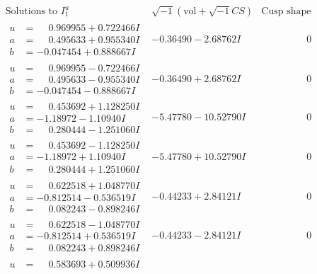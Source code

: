 \documentclass[1p]{elsarticle_modified}
\theoremstyle{definition}
\newcommand{\I}{\sqrt{-1}}
\begin{document}
$$\begin{array}{c|c|c}
\text{Solutions to }I^u_{1}& \I (\text{vol} + \sqrt{-1}CS) & \text{Cusp shape}\\
 \hline 
\begin{aligned}
u &= \phantom{-}0.969955 + 0.722466 I \\
a &= \phantom{-}0.495633 + 0.955340 I \\
b &= -0.047454 + 0.888667 I\end{aligned}
 & -0.36490 - 2.68762 I & \phantom{-0.000000 } 0 \\ \hline\begin{aligned}
u &= \phantom{-}0.969955 - 0.722466 I \\
a &= \phantom{-}0.495633 - 0.955340 I \\
b &= -0.047454 - 0.888667 I\end{aligned}
 & -0.36490 + 2.68762 I & \phantom{-0.000000 } 0 \\ \hline\begin{aligned}
u &= \phantom{-}0.453692 + 1.128250 I \\
a &= -1.18972 - 1.10940 I \\
b &= \phantom{-}0.280444 - 1.251060 I\end{aligned}
 & -5.47780 - 10.52790 I & \phantom{-0.000000 } 0 \\ \hline\begin{aligned}
u &= \phantom{-}0.453692 - 1.128250 I \\
a &= -1.18972 + 1.10940 I \\
b &= \phantom{-}0.280444 + 1.251060 I\end{aligned}
 & -5.47780 + 10.52790 I & \phantom{-0.000000 } 0 \\ \hline\begin{aligned}
u &= \phantom{-}0.622518 + 1.048770 I \\
a &= -0.812514 - 0.536519 I \\
b &= \phantom{-}0.082243 - 0.898246 I\end{aligned}
 & -0.44233 + 2.84121 I & \phantom{-0.000000 } 0 \\ \hline\begin{aligned}
u &= \phantom{-}0.622518 - 1.048770 I \\
a &= -0.812514 + 0.536519 I \\
b &= \phantom{-}0.082243 + 0.898246 I\end{aligned}
 & -0.44233 - 2.84121 I & \phantom{-0.000000 } 0 \\ \hline\begin{aligned}
u &= \phantom{-}0.583693 + 0.509936 I \\

\end{aligned}
\end{array}$$
\end{document}
